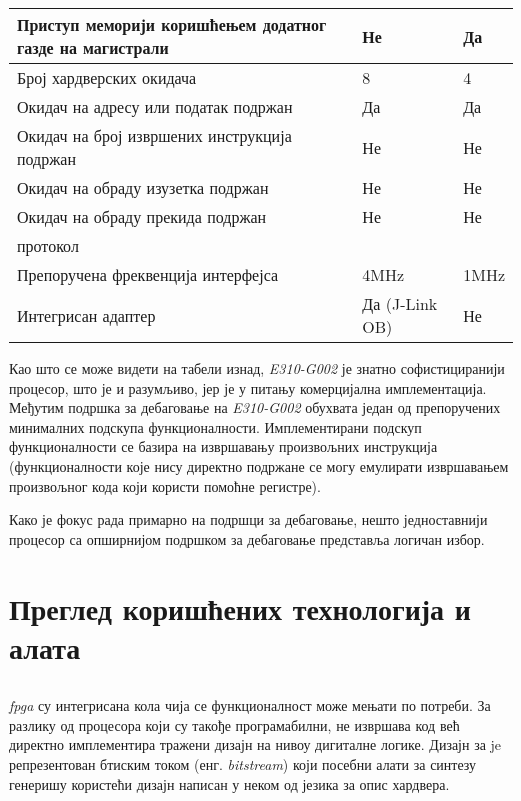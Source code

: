 \begin{table}[h!]
\begin{tabular}{|p{5.5cm}|l|l|}
		\hline Приступ меморији коришћењем додатног газде на магистрали & Не & Да \\
		\hline Број хардверских окидача & 8 & 4 \\
		\hline Окидач на адресу или податак подржан & Да & Да\footnotemark \\
		\hline Окидач на број извршених инструкција подржан & Не & Не \\
		\hline Окидач на обраду изузетка подржан & Не & Не \\
		\hline Окидач на обраду прекида подржан & Не & Не \\
		\hline {}{} протокол & \јтаг{} & {} \\
		\hline Препоручена фреквенција {} интерфејса & 4MHz & 1MHz \\
		\hline Интегрисан {} адаптер & Да (J-Link OB) & Не \\
		\hline
	\end{tabular}
\end{table}


Као што се може видети на табели изнад, \textit{E310-G002} је знатно софистициранији процесор, што је и разумљиво, јер је у питању комерцијална имплементација.
Међутим подршка за дебаговање на \textit{E310-G002} обухвата један од препоручених минималних подскупа функционалности. 
Имплементирани подскуп функционалности се базира на извршавању произвољних инструкција (функционалности које нису директно подржане се могу емулирати извршавањем произвољног кода који користи помоћне регистре).

Како је фокус рада примарно на подршци за дебаговање, нешто једноставнији процесор са опширнијом подршком за дебаговање представља логичан избор.

\section{Преглед коришћених технологија и алата}

\subsection{}

\textit{\acrfull{fpga}} су интегрисана кола чија се функционалност може мењати по потреби. За разлику од процесора који су такође програмабилни,  не извршава код већ директно имплементира тражени дизајн на нивоу дигиталне логике. Дизајн за  je репрезентован бтиским током (енг. \textit{bitstream}) који посебни алати за синтезу генеришу користећи дизајн написан у неком од језика за опис хардвера.

